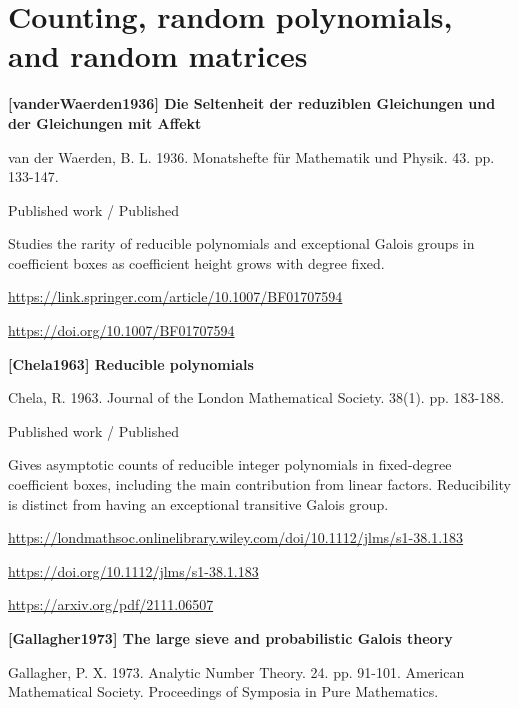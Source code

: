 \documentclass[11pt,a4paper,oneside,openany]{book}
\begin{document}
\vspace{9pt}
\section{Counting, random polynomials, and random matrices}
\hypertarget{ref:vanderWaerden1936}{}
{\sffamily\bfseries\color{atlasgreen}[vanderWaerden1936] Die Seltenheit der reduziblen Gleichungen und der Gleichungen mit Affekt}\par
\color{black} van der Waerden, B. L. 1936. Monatshefte für Mathematik und Physik. 43. pp. 133-147.\par
{\small\sffamily\color{atlasgold}Published work / Published}\par
\color{black} Studies the rarity of reducible polynomials and exceptional Galois groups in coefficient boxes as coefficient height grows with degree fixed.\par
{\footnotesize\url{https://link.springer.com/article/10.1007/BF01707594}}\par
{\footnotesize\url{https://doi.org/10.1007/BF01707594}}\par
\vspace{9pt}
\hypertarget{ref:Chela1963}{}
{\sffamily\bfseries\color{atlasgreen}[Chela1963] Reducible polynomials}\par
\color{black} Chela, R. 1963. Journal of the London Mathematical Society. 38(1). pp. 183-188.\par
{\small\sffamily\color{atlasgold}Published work / Published}\par
\color{black} Gives asymptotic counts of reducible integer polynomials in fixed-degree coefficient boxes, including the main contribution from linear factors. Reducibility is distinct from having an exceptional transitive Galois group.\par
{\footnotesize\url{https://londmathsoc.onlinelibrary.wiley.com/doi/10.1112/jlms/s1-38.1.183}}\par
{\footnotesize\url{https://doi.org/10.1112/jlms/s1-38.1.183}}\par
{\footnotesize\url{https://arxiv.org/pdf/2111.06507}}\par
\vspace{9pt}
\hypertarget{ref:Gallagher1973}{}
{\sffamily\bfseries\color{atlasgreen}[Gallagher1973] The large sieve and probabilistic Galois theory}\par
\color{black} Gallagher, P. X. 1973. Analytic Number Theory. 24. pp. 91-101. American Mathematical Society. Proceedings of Symposia in Pure Mathematics.\par
\end{document}

